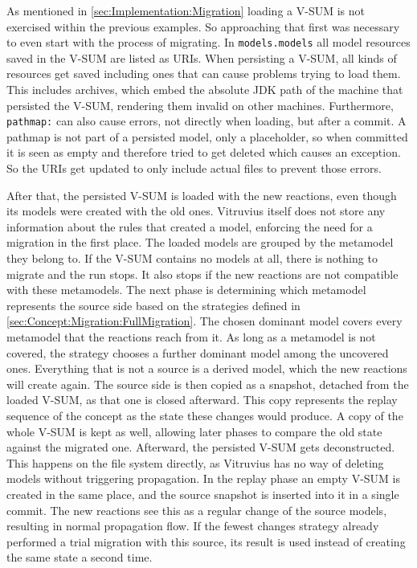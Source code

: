 As mentioned in \autoref{sec:Implementation:Migration} loading a V-SUM is not exercised within the previous examples.
So approaching that first was necessary to even start with the process of migrating.
In \texttt{models.models} all model resources saved in the V-SUM are listed as URIs.
When persisting a V-SUM, all kinds of resources get saved including ones that can cause problems trying to load them.
This includes archives, which embed the absolute JDK path of the machine that persisted the V-SUM, rendering them invalid on other machines.
Furthermore, \texttt{pathmap:} can also cause errors, not directly when loading, but after a commit.
A pathmap is not part of a persisted model, only a placeholder, so when committed it is seen as empty and therefore tried to get deleted which causes an exception.
So the URIs get updated to only include actual files to prevent those errors.

After that, the persisted V-SUM is loaded with the new reactions, even though its models were created with the old ones.
Vitruvius itself does not store any information about the rules that created a model, enforcing the need for a migration in the first place.
The loaded models are grouped by the metamodel they belong to.
If the V-SUM contains no models at all, there is nothing to migrate and the run stops.
It also stops if the new reactions are not compatible with these metamodels.
The next phase is determining which metamodel represents the source side based on the strategies defined in \autoref{sec:Concept:Migration:FullMigration}.
The chosen dominant model covers every metamodel that the reactions reach from it.
As long as a metamodel is not covered, the strategy chooses a further dominant model among the uncovered ones.
Everything that is not a source is a derived model, which the new reactions will create again.
The source side is then copied as a snapshot, detached from the loaded V-SUM, as that one is closed afterward.
This copy represents the replay sequence of the concept as the state these changes would produce.
A copy of the whole V-SUM is kept as well, allowing later phases to compare the old state against the migrated one.
Afterward, the persisted V-SUM gets deconstructed.
This happens on the file system directly, as Vitruvius has no way of deleting models without triggering propagation.
In the replay phase an empty V-SUM is created in the same place, and the source snapshot is inserted into it in a single commit.
The new reactions see this as a regular change of the source models, resulting in normal propagation flow.
If the fewest changes strategy already performed a trial migration with this source, its result is used instead of creating the same state a second time.

